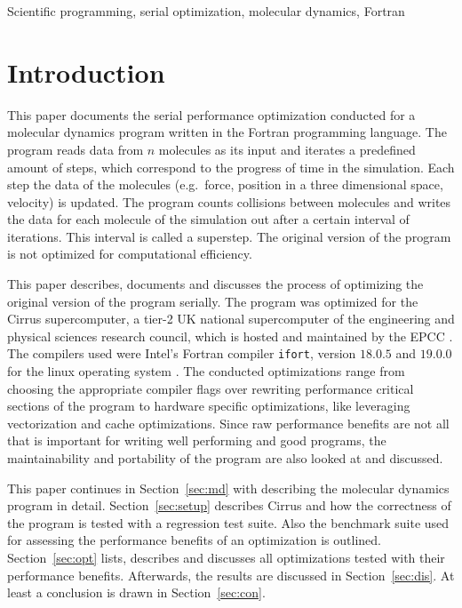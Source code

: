 \documentclass[twoside,11pt]{article}
\title{\titl}
\author{}
\begin{document}
\maketitle

\begin{abstract}
\end{abstract}

\begin{keywords}
Scientific programming, serial optimization, molecular dynamics,
Fortran
\end{keywords}

\section{Introduction} %
\label{sec:intro}

This paper documents the serial performance optimization conducted for
a molecular dynamics program written in the Fortran programming
language.
The program reads data from $n$ molecules as its input and iterates
a predefined amount of steps, which correspond to the progress of time
in the simulation.
Each step the data of the molecules (e.g.\ force, position in a three
dimensional space, velocity) is updated.
The program counts collisions between molecules and writes the
data for each molecule of the simulation out after a certain interval
of iterations.
This interval is called a superstep.
The original version of the program is not optimized for computational
efficiency.

This paper describes, documents and discusses the process of
optimizing the original version of the program serially.
The program was optimized for the Cirrus supercomputer, a tier-2
UK national supercomputer of the engineering and physical sciences
research council, which is hosted and maintained by the EPCC
\citep{cirrus}.
The compilers used were Intel's Fortran compiler \texttt{ifort},
version $18.0.5$ and $19.0.0$ for the linux operating system
\citep{ifort18, ifort19}.
The conducted optimizations range from choosing the appropriate
compiler flags over rewriting performance critical sections of the
program to hardware specific optimizations, like leveraging
vectorization and cache optimizations.
Since raw performance benefits are not all that is important for
writing well performing and good programs, the maintainability and
portability of the program are also looked at and discussed.


This paper continues in Section~\ref{sec:md} with describing the
molecular dynamics program in detail.
Section~\ref{sec:setup} describes Cirrus and how the correctness of
the program is tested with a regression test suite.
Also the benchmark suite used for assessing the performance benefits
of an optimization is outlined.
Section~\ref{sec:opt} lists, describes and discusses all
optimizations tested with their performance benefits.
Afterwards, the results are discussed in Section~\ref{sec:dis}.
At least a conclusion is drawn in Section~\ref{sec:con}.
\end{document}
